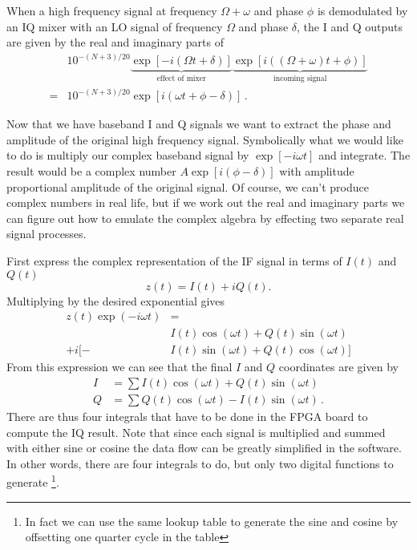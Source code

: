 
When a high frequency signal at frequency $\Omega+\omega$ and phase $\phi$ is demodulated by an IQ mixer with an LO signal of frequency $\Omega$ and phase $\delta$, the I and Q outputs are given by the real and imaginary parts of
\begin{align}
& 10^{-(N+3)/20} \underbrace{\exp \left[-i \left( \Omega t + \delta \right) \right]}_{\textrm{effect of mixer}} \underbrace{\exp \left[ i \left( \left( \Omega + \omega \right) t + \phi \right) \right]}_{\textrm{incoming signal}} \nonumber \\
=& 10^{-(N+3)/20} \exp \left[ i \left( \omega t + \phi-\delta \right) \right] \, . \nonumber
\end{align}


Now that we have baseband I and Q signals we want to extract the phase and amplitude of the original high frequency signal.
Symbolically what we would like to do is multiply our complex baseband signal by $\exp \left[ -i \omega t \right]$ and integrate.
The result would be a complex number $A \exp \left[ i \left( \phi - \delta \right) \right]$ with amplitude proportional amplitude of the original signal.
Of course, we can't produce complex numbers in real life, but if we work out the real and imaginary parts we can figure out how to emulate the complex algebra by effecting two separate real signal processes.

First express the complex representation of the IF signal in terms of $I(t)$ and $Q(t)$ \begin{equation}
z(t) = I(t) + iQ(t). \end{equation}
Multiplying by the desired exponential gives \begin{align}
z(t) \exp \left(-i \omega t \right) &= \nonumber \\
        & I(t) \cos (\omega t) + Q(t) \sin (\omega t) \nonumber \\
+ i [ - & I(t) \sin (\omega t) + Q(t) \cos (\omega t) ] \end{align}
From this expression we can see that the final $I$ and $Q$ coordinates are given by \begin{align}
I &= \sum I(t)\cos(\omega t) + Q(t) \sin(\omega t) \\
Q &= \sum Q(t)\cos(\omega t) - I(t) \sin(\omega t) \, .
\end{align}
There are thus four integrals that have to be done in the FPGA board to compute the IQ result. Note that since each signal is multiplied and summed with either sine or cosine the data flow can be greatly simplified in the software. In other words, there are four integrals to do, but only two digital functions to generate \footnote{In fact we can use the same lookup table to generate the sine and cosine by offsetting one quarter cycle in the table}.

